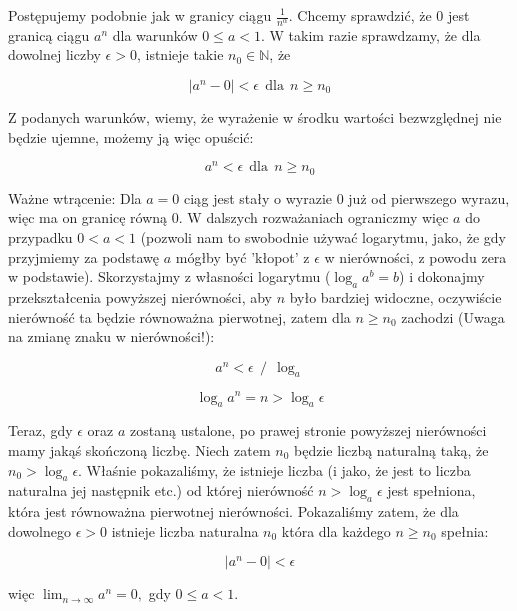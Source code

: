 \documentclass[a4paper,oneside,openright,11pt]{article}
\numberwithin{equation}{section}
\begin{document}
Postępujemy podobnie jak w granicy ciągu $\frac{1}{n^{\alpha}}$. Chcemy sprawdzić, że $0$ jest granicą ciągu $a^n$ dla warunków $0 \leq a < 1$.
W takim razie sprawdzamy, że dla dowolnej liczby $\epsilon > 0$, istnieje takie $n_0 \in \mathbb{N}$, że

\begin{equation*}
    |a^{n} - 0| < \epsilon \ \ \textrm{dla} \ \ n \geq n_0
\end{equation*}


\noindent
Z podanych warunków, wiemy, że wyrażenie w środku wartości bezwzględnej nie będzie ujemne, możemy ją więc opuścić:

\begin{equation*}
    a^{n}  < \epsilon \ \ \textrm{dla} \ \ n \geq n_0
\end{equation*}

\noindent
Ważne wtrącenie: Dla $a = 0$ ciąg jest stały o wyrazie $0$ już od pierwszego wyrazu, więc ma on granicę równą $0$. W dalszych rozważaniach ograniczmy więc $a$ do przypadku $0 < a < 1$ (pozwoli nam to swobodnie używać
logarytmu, jako, że gdy przyjmiemy za podstawę $a$ mógłby być 'kłopot' z $\epsilon$ w nierówności, z powodu zera w podstawie).
Skorzystajmy z własności logarytmu ($\log _{a} a^b = b$) i dokonajmy przekształcenia powyższej nierówności, aby $n$ było bardziej widoczne, oczywiście
nierówność ta będzie równoważna pierwotnej, zatem dla $n \geq n_0$ zachodzi (Uwaga na zmianę znaku w nierówności!):

\begin{equation*}
    a^{n}  < \epsilon \ \ / \ \ \log _{a}
\end{equation*}

\begin{equation*}
    \log _{a} a^{n} = n > \log _{a} \epsilon 
\end{equation*}

\noindent
Teraz, gdy $\epsilon$ oraz $a$ zostaną ustalone, po prawej stronie powyższej nierówności mamy jakąś skończoną liczbę.
Niech zatem $n_0$ będzie liczbą naturalną taką, że $n_0 > \log _{a} \epsilon$. Właśnie pokazaliśmy, że istnieje liczba (i jako, że jest to liczba naturalna jej następnik etc.) od której
nierówność $n > \log _{a} \epsilon$ jest spełniona, która jest równoważna pierwotnej nierówności. Pokazaliśmy zatem, że dla dowolnego $\epsilon > 0$ istnieje liczba naturalna $n_0$ która dla każdego $n \geq n_0$
spełnia:


\begin{equation*}
    |a^{n} - 0| < \epsilon
\end{equation*}

\vspace{10mm}


więc $\lim_{n\to\infty} a^{n} = 0,$ gdy $0 \leq a < 1$.
\end{document}
